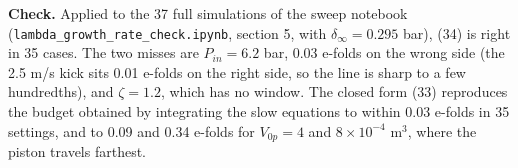 \textbf{Check.} Applied to the 37 full simulations of the sweep notebook (\texttt{lambda\_growth\_rate\_check.ipynb}, section 5, with $\delta_\infty = 0.295$ bar), (34) is right in 35 cases. The two misses are $P_{in} = 6.2$ bar, 0.03 e-folds on the wrong side (the 2.5 m/s kick sits 0.01 e-folds on the right side, so the line is sharp to a few hundredths), and $\zeta = 1.2$, which has no window. The closed form (33) reproduces the budget obtained by integrating the slow equations to within 0.03 e-folds in 35 settings, and to 0.09 and 0.34 e-folds for $V_{0p} = 4$ and $8\times10^{-4}$ m$^3$, where the piston travels farthest.
